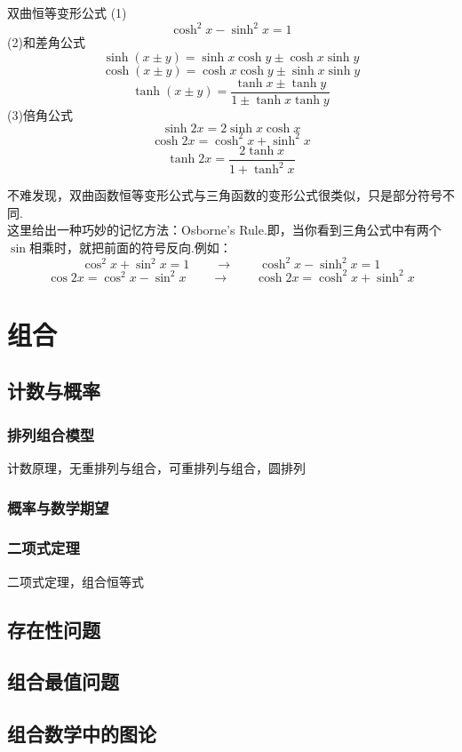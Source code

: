 \documentclass[lang=cn, zihao=5]{elegantbook}
\begin{document}
\begin{proposition}{双曲恒等变形公式}
    (1)$$\cosh^2{x}-\sinh^2{x}=1$$
    (2)和差角公式
    $$\sinh{(x \pm y)}=\sinh{x}\cosh{y} \pm \cosh{x}\sinh{y}$$
    $$\cosh{(x \pm y)}=\cosh{x}\cosh{y} \pm \sinh{x}\sinh{y}$$
    $$\tanh{(x \pm y)}=\frac{\tanh{x} \pm \tanh{y}}{1 \pm \tanh{x}\tanh{y}}$$
    (3)倍角公式
    $$\sinh{2x}=2\sinh{x}\cosh{x}$$
    $$\cosh{2x}=\cosh^2{x}+\sinh^2{x}$$
    $$\tanh{2x}=\frac{2\tanh{x}}{1+\tanh^2{x}}$$
\end{proposition}
\begin{remark}
    不难发现，双曲函数恒等变形公式与三角函数的变形公式很类似，只是部分符号不同.\\
    这里给出一种巧妙的记忆方法：Osborne's Rule.即，当你看到三角公式中有两个$\sin$相乘时，就把前面的符号反向.例如：$$\cos^2{x}+\sin^2{x}=1 \qquad \longrightarrow \qquad \cosh^2{x}-\sinh^2{x}=1$$
    $$\cos{2x}=\cos^2{x}-\sin^2{x} \qquad \longrightarrow \qquad \cosh{2x}=\cosh^2{x}+\sinh^2{x}$$
\end{remark}

\part{组合}

\chapter{计数与概率}

\section{排列组合模型}

计数原理，无重排列与组合，可重排列与组合，圆排列

\section{概率与数学期望}

\section{二项式定理}

二项式定理，组合恒等式

\chapter{存在性问题}

\chapter{组合最值问题}

\chapter{组合数学中的图论}
\end{document}
